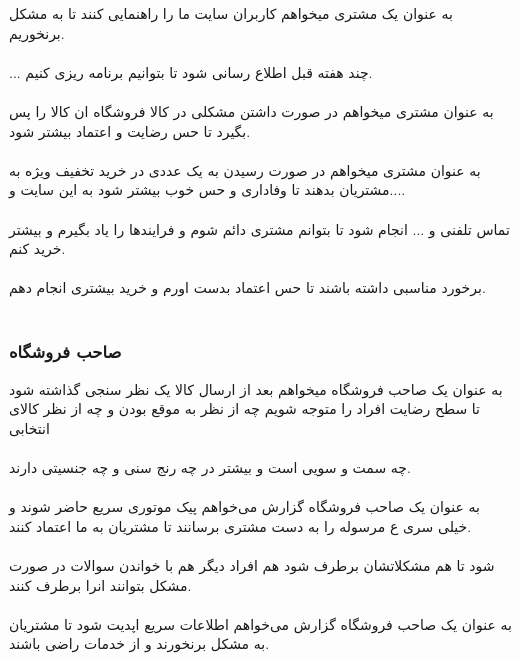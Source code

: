 \documentclass[12pt,onecolumn,a4paper]{article}
\begin{document}
به عنوان یک مشتری میخواهم کاربران سایت ما را راهنمایی کنند تا به مشکل برنخوریم.\\
\\

... چند هفته قبل اطلاع رسانی شود تا بتوانیم برنامه ریزی کنیم.\\
\\


به عنوان مشتری میخواهم در صورت داشتن مشکلی در کالا فروشگاه ان کالا را پس بگیرد تا حس رضایت و اعتماد بیشتر شود.\\
\\


به عنوان مشتری میخواهم در صورت رسیدن به یک عددی در خرید تخفیف ویژه به مشتریان بدهند تا وفاداری و حس خوب بیشتر شود به این سایت و....\\
\\

 تماس تلفنی و ... انجام شود تا بتوانم مشتری دائم شوم و فرایندها را یاد بگیرم و بیشتر خرید کنم.\\
\\

 برخورد مناسبی داشته باشند تا حس اعتماد بدست اورم و خرید بیشتری انجام دهم.\\
\\




\subsubsection{ صاحب فروشگاه  }

	  به عنوان یک صاحب فروشگاه میخواهم بعد از ارسال کالا یک نظر سنجی گذاشته شود تا سطح رضایت افراد را متوجه شویم چه از نظر به موقع بودن و چه از نظر کالای انتخابی\\
	  \\

 چه سمت و سویی است و بیشتر در چه رنج سنی و چه جنسیتی دارند.\\
\\


به عنوان یک صاحب فروشگاه گزارش می‌خواهم پیک موتوری سریع حاضر شوند و خیلی سری
ع مرسوله را به دست مشتری برسانند تا مشتریان به ما اعتماد کنند.\\
\\


 شود تا هم مشکلاتشان برطرف شود هم افراد دیگر هم با خواندن سوالات در صورت مشکل بتوانند انرا برطرف کنند.\\
\\


به عنوان یک صاحب فروشگاه گزارش می‌خواهم اطلاعات سریع اپدیت شود تا مشتریان به مشکل برنخورند و از خدمات راضی باشند.\\
\\
\end{document}
